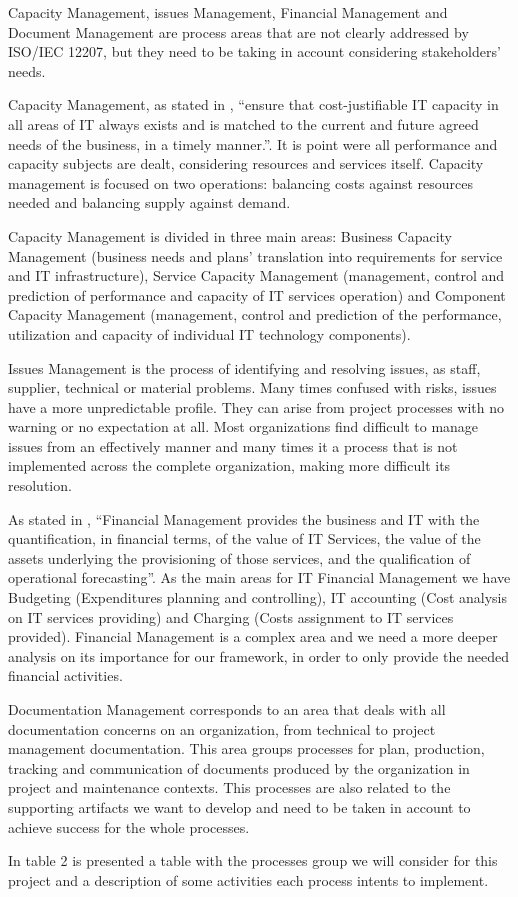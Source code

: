 Capacity Management, issues Management, Financial Management and Document Management are process areas that are not clearly addressed by ISO/IEC 12207, but they need to be taking in account considering stakeholders' needs.\par
Capacity Management, as stated in \cite{itilSD}, ``ensure that cost-justifiable IT capacity in all areas of IT always exists and is matched to the current and future agreed needs of the business, in a timely manner.''. It is point were all performance and capacity subjects are dealt, considering resources and services itself. Capacity management is focused on two operations: balancing costs against resources needed and balancing supply against demand.\par
Capacity Management is divided in three main areas: Business Capacity Management (business needs and plans' translation into requirements for service and IT infrastructure), Service Capacity Management (management, control and prediction of performance and capacity of IT services operation) and Component Capacity Management (management, control and prediction of the performance, utilization and capacity of individual IT technology components).\par
Issues Management is the process of identifying and resolving issues, as staff, supplier, technical or material problems. Many times confused with risks, issues have a more unpredictable profile. They can arise from project processes with no warning or no expectation at all. Most organizations find difficult to manage issues from an effectively manner and many times it a process that is not implemented across the complete organization, making more difficult its resolution.\par
As stated in \cite{itilSS}, ``Financial Management provides the business and IT with the quantification, in financial terms, of the value of IT Services, the value of the assets underlying the provisioning of those services, and the qualification of operational forecasting''. As the main areas for IT Financial Management we have Budgeting (Expenditures planning and controlling), IT accounting (Cost analysis on IT services providing) and Charging (Costs assignment to IT services provided). Financial Management is a complex area and we need a more deeper analysis on its importance for our framework, in order to only provide the needed financial activities.\par
Documentation Management corresponds to an area that deals with all documentation concerns on an organization, from technical to project management documentation. This area groups processes for plan, production, tracking and communication of documents produced by the organization in project and maintenance contexts. This processes are also related to the supporting artifacts we want to develop and need to be taken in account to achieve success for the whole processes.\par
In table 2 is presented a table with the processes group we will consider for this project and a description of some activities each process intents to implement.

